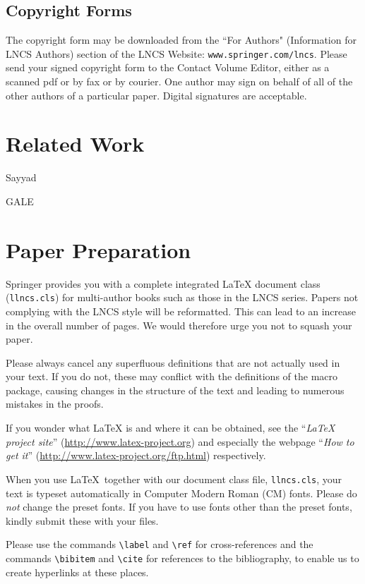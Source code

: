 \documentclass[runningheads]{llncs}
\begin{document}
\subsection{Copyright Forms}

The copyright form may be downloaded from the ``For Authors"
(Information for LNCS Authors)
section of the LNCS Website: \texttt{www.springer.com/lncs}.
Please send your signed copyright
form to the Contact Volume Editor, either as a scanned pdf or by fax or
by courier. One author may sign on behalf of all of the other authors of a particular
paper. Digital signatures are acceptable.

\section{Related Work}

Sayyad

GALE




\section{Paper Preparation}

Springer
provides you with a complete integrated \LaTeX{} document class (\texttt{llncs.cls})
for multi-author books such as those in the LNCS series.
Papers not complying with the LNCS style will be reformatted. This can
lead to an increase in the overall number of pages. We would therefore
urge you not to squash your paper.

Please always cancel any superfluous definitions that are
not actually used in your text. If you do not, these may conflict with
the definitions of the macro package, causing changes in the structure
of the text and leading to numerous mistakes in the proofs.

If you wonder what \LaTeX{} is and where it can be obtained, see the
``\textit{LaTeX project site}'' (\url{http://www.latex-project.org})
and especially the webpage ``\textit{How to get it}''
(\url{http://www.latex-project.org/ftp.html}) respectively.

When you use \LaTeX\ together with our document class file,
\texttt{llncs.cls},
your text is typeset automatically in Computer Modern Roman (CM) fonts.
Please do
\emph{not} change the preset fonts. If you have to use fonts other
than the preset fonts, kindly submit these with your files.

Please use the commands \verb+\label+ and \verb+\ref+ for
cross-references and the commands \verb+\bibitem+ and \verb+\cite+ for
references to the bibliography, to enable us to create hyperlinks at
these places.
\end{document}
